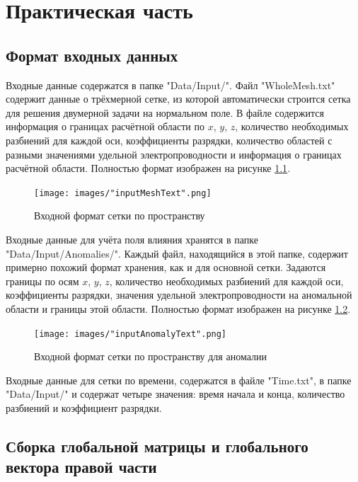 \chapter{Практическая часть}

\section{Формат входных данных}

Входные данные содержатся в папке "Data/Input/". Файл "WholeMesh.txt" содержит данные о трёхмерной сетке, из которой автоматически строится сетка для решения двумерной задачи на нормальном поле. В файле содержится информация о границах расчётной  области по $x$, $y$, $z$, количество необходимых разбиений для каждой оси, коэффициенты разрядки, количество областей с разными значениями удельной электропроводности и информация о границах расчётной области. Полностью формат изображен на рисунке \ref{fig:TextWholeMesh}.

\begin{figure}
	\centering
	\vspace*{0.7cm}
	\texttt{[image: images/"inputMeshText".png]}
	\caption{Входной формат сетки по пространству}
	\label{fig:TextWholeMesh}
\end{figure}

Входные данные для учёта поля влияния хранятся в папке "Data/Input/Anomalies/". Каждый файл, находящийся в этой папке, содержит примерно похожий формат хранения, как и для основной сетки. Задаются границы по осям $x$, $y$, $z$, количество необходимых разбиений для каждой оси, коэффициенты разрядки, значения удельной электропроводности на аномальной области и границы этой области. Полностью формат изображен на рисунке \ref{fig:TextAnomalyMesh}.

\begin{figure}
	\centering
	\vspace*{0.7cm}
	\texttt{[image: images/"inputAnomalyText".png]}
	\caption{Входной формат сетки по пространству для аномалии}
	\label{fig:TextAnomalyMesh}
\end{figure}

Входные данные для сетки по времени, содержатся в файле "Time.txt", в папке "Data/Input/" и содержат четыре значения: время начала и конца, количество разбиений и коэффициент разрядки.

\section{Сборка глобальной матрицы и глобального вектора правой части}

